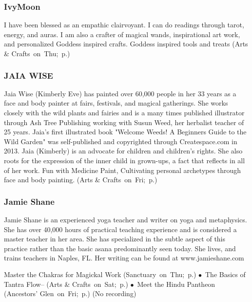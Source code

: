 \vspace{6pt}

\subsubsection{IvyMoon} %
{  \small  I have been blessed as an empathic clairvoyant. I can do readings through tarot, energy, and auras. I am also a crafter of magical wands, inspirational art work, and personalized Goddess inspired crafts. } %
\hspace{2em} {\footnotesize Goddess inspired tools and treats (Arts \& Crafts~on~Thu;~p.\pageref{Thu-Ivy1})}

\vspace{6pt}

\subsubsection{JAIA WISE} %
{  \small  Jaia Wise (Kimberly Eve) has painted over 60,000 people in her 33 years as a face and body painter at fairs, festivals, and magical gatherings. She works closely with the wild plants and fairies and is a many times published illustrator through Ash Tree Publishing working with Susun Weed, her herbalist teacher of 25 years. Jaia's first illustrated book "Welcome Weeds! A Beginners Guide to the Wild Garden" was self-published and copyrighted through Createspace.com in 2013. Jaia (Kimberly) is an advocate for children and children's rights. She also roots for the expression of the inner child in grown-ups, a fact that reflects in all of her work. } %
\hspace{2em} {\footnotesize Fun with Medicine Paint, Cultivating  personal archetypes through face and body painting. (Arts \& Crafts~on~Fri;~p.\pageref{Fri-Wise1})}

\vspace{6pt}

\subsubsection{Jamie Shane} %
{  \small  Jamie Shane is an experienced yoga teacher and writer on yoga and metaphysics. She has over 40,000 hours of practical teaching experience and is considered a master teacher in her area. She has specialized in the subtle aspect of this practice rather than the basic asana predominantly seen today. She lives, and trains teachers in Naples, FL. Her writing can be found at www.jamieshane.com

 } %
\hspace{2em} {\footnotesize Master the Chakras for  Magickal Work (Sanctuary~on~Thu;~p.\pageref{Thu-Shane1}) $\bullet$~The Basics of Tantra Flow-- (Arts \& Crafts~on~Sat;~p.\pageref{Sat-Shane2}) $\bullet$~Meet the Hindu Pantheon (Ancestors' Glen~on~Fri;~p.\pageref{Fri-Shane3})}
 {\small (No recording)} 

